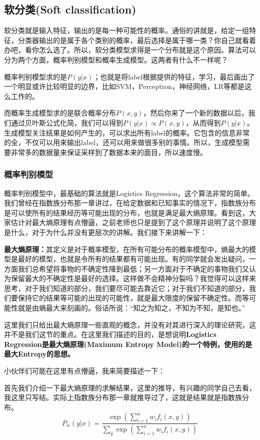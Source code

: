 \documentclass[a4paper]{article}
\begin{document}
\subsection{软分类(Soft classification)}
软分类就是输入特征，输出的是每一种可能性的概率。通俗的讲就是，给定一组特征，分类器输出的是属于各个类别的概率，最后选择是属于哪一类？你自己就看着办吧，看你怎么选了。所以，软分类模型求得是一个分布就是这个原因。算法可以分为两个方面，概率判别模型和概率生成模型。这两者有什么不一样呢？

概率判别模型求的是$P(y|x)$；也就是将label根据提供的特征，学习，最后画出了一个明显或许比较明显的边界，比如SVM，Perceptron，神经网络，LR等都是这么工作的。

而概率生成模型求的是联合概率分布$P(x,y)$，然后你来了一个新的数据以后，我们通过贝叶斯公式化简，我们可以得到$P(y|x) \propto P(x,y)$，从而得到$P(y|x)$。生成模型关注结果是如何产生的，可以求出所有label的概率。它包含的信息非常的全，不仅可以用来输出label，还可以用来做很多别的事情。所以，生成模型需要非常多的数据量来保证采样到了数据本来的面目，所以速度慢。
\subsubsection{概率判别模型}
概率判别模型中，最基础的算法就是Logistics Regression，这个算法非常的简单。我们曾经在指数族分布那一章讲过，在给定数据和已知事实的情况下，指数族分布是可以使所有的结果经历等可能出现的分布，也就是满足最大熵原理。看到这，大家估计对最大熵原理有点懵逼，之前老师也只是提到了这个原理并说明了这个原理是什么，对于为什么并没有更层次的讲解。我们接下来讲解一下：

\textbf{最大熵原理：}其定义是对于概率模型，在所有可能分布的概率模型中，熵最大的模型是最好的模型，也就是令所有的结果都有可能出现。有的同学就会发出疑问，一方面我们总希望将事物的不确定性降到最低；另一方面对于不确定的事物我们又认为保留最大的不确定性是最好的选择。这样做不会精神分裂吗？我觉得可以这样来思考，对于我们知道的部分，我们要尽可能去靠近它；对于我们不知道的部分，我们要保持它的结果等可能的出现的可能性，就是最大限度的保留不确定性。而等可能性就是由熵最大来刻画的。俗话所说：“知之为知之，不知为不知，是知也。”

这里我们只给出最大熵原理一些直观的概念，并没有对其进行深入的理论研究，这并不是我们这节的重点。在这里我们描述的目的，是想说明\textbf{Logistics Regression是最大熵原理(Maximum Entropy Model)的一个特例，使用的是最大Entropy的思想。}

小伙伴们可能在这里有点懵逼，我来简要描述一下：

首先我们介绍一下最大熵原理的求解结果，这里的推导，有兴趣的同学自己去看，我这里只写结。实际上指数族分布那一章就推导过了，这就是结果就是指数族分布。
\begin{equation}
    P_w(y|x) = \frac{\exp (\sum_{i=1}^n w_if_i(x,y))}{\sum_y \exp \left( \sum_{i=1}^n w_if_i(x,y) \right)}
\end{equation}
\end{document}
